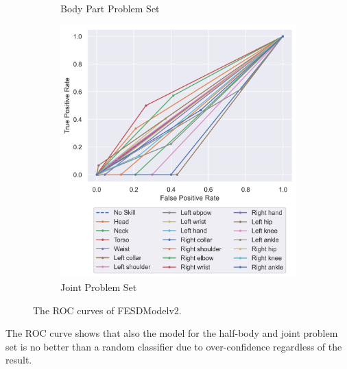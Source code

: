 \begin{figure}
\begin{subfigure}[b]{0.47\linewidth}
      \caption[]{Body Part Problem Set}
      \label{fig:bp_roc_v2}
  \end{subfigure}
  \hfill
  \begin{subfigure}[b]{0.47\linewidth}
      \centering
      \includegraphics[width=\textwidth]{figures/Results/v2/roc/jt.png}
      \caption[]{Joint Problem Set}
      \label{fig:jt_roc_v2}
  \end{subfigure}
  \caption[ROC Curves of FESDModelv2]{The ROC curves of FESDModelv2.}
  \label{fig:roc_v2}
\end{figure}

The ROC curve shows that also the model for the half-body and joint problem set is no better than a random classifier due to over-confidence regardless of the result.